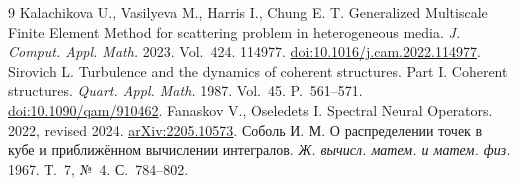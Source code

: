 \documentclass[11pt,a4paper]{article}
\begin{document}
\begingroup\small\begin{thebibliography}{9}\setlength{\itemsep}{0pt}
 Kalachikova U., Vasilyeva M., Harris I., Chung E. T. Generalized Multiscale Finite Element Method for scattering problem in heterogeneous media. \emph{J. Comput. Appl. Math.} 2023. Vol.~424. 114977. \href{https://doi.org/10.1016/j.cam.2022.114977}{doi:10.1016/j.cam.2022.114977}.
 Sirovich L. Turbulence and the dynamics of coherent structures. Part I. Coherent structures. \emph{Quart. Appl. Math.} 1987. Vol.~45. P.~561--571. \href{https://doi.org/10.1090/qam/910462}{doi:10.1090/qam/910462}.
 Fanaskov V., Oseledets I. Spectral Neural Operators. 2022, revised 2024. \href{https://arxiv.org/abs/2205.10573}{arXiv:2205.10573}.
 Соболь И. М. О распределении точек в кубе и приближённом вычислении интегралов. \emph{Ж. вычисл. матем. и матем. физ.} 1967. Т.~7, №~4. С.~784--802.
\end{thebibliography}\endgroup
\end{document}
